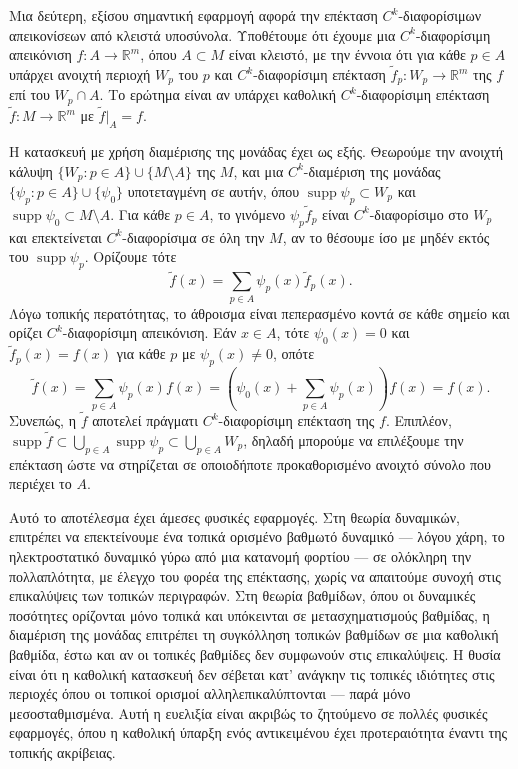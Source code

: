 \documentclass[11pt,a4paper,twoside,openright]{book}
\begin{document}
Μια δεύτερη, εξίσου σημαντική εφαρμογή αφορά την επέκταση $C^k$-διαφορίσιμων απεικονίσεων από κλειστά υποσύνολα. Υποθέτουμε ότι έχουμε μια $C^k$-διαφορίσιμη απεικόνιση $f: A \to \mathbb{R}^m$, όπου $A \subset M$ είναι κλειστό, με την έννοια ότι για κάθε $p \in A$ υπάρχει ανοιχτή περιοχή $W_p$ του $p$ και $C^k$-διαφορίσιμη επέκταση $\widetilde{f}_p: W_p \to \mathbb{R}^m$ της $f$ επί του $W_p \cap A$. Το ερώτημα είναι αν υπάρχει καθολική $C^k$-διαφορίσιμη επέκταση $\widetilde{f}: M \to \mathbb{R}^m$ με $\widetilde{f}|_A = f$.

Η κατασκευή με χρήση διαμέρισης της μονάδας έχει ως εξής. Θεωρούμε την ανοιχτή κάλυψη $\{W_p : p \in A\} \cup \{M \setminus A\}$ της $M$, και μια $C^k$-διαμέριση της μονάδας $\{\psi_p : p \in A\} \cup \{\psi_0\}$ υποτεταγμένη σε αυτήν, όπου $\operatorname{supp} \psi_p \subset W_p$ και $\operatorname{supp} \psi_0 \subset M \setminus A$. Για κάθε $p \in A$, το γινόμενο $\psi_p \widetilde{f}_p$ είναι $C^k$-διαφορίσιμο στο $W_p$ και επεκτείνεται $C^k$-διαφορίσιμα σε όλη την $M$, αν το θέσουμε ίσο με μηδέν εκτός του $\operatorname{supp} \psi_p$. Ορίζουμε τότε
\begin{equation*}
\widetilde{f}(x) = \sum_{p \in A} \psi_p(x) \widetilde{f}_p(x).
\end{equation*}
Λόγω τοπικής περατότητας, το άθροισμα είναι πεπερασμένο κοντά σε κάθε σημείο και ορίζει $C^k$-διαφορίσιμη απεικόνιση. Εάν $x \in A$, τότε $\psi_0(x) = 0$ και $\widetilde{f}_p(x) = f(x)$ για κάθε $p$ με $\psi_p(x) \neq 0$, οπότε
\begin{equation*}
\widetilde{f}(x) = \sum_{p \in A} \psi_p(x) f(x) = \left( \psi_0(x) + \sum_{p \in A} \psi_p(x) \right) f(x) = f(x).
\end{equation*}
Συνεπώς, η $\widetilde{f}$ αποτελεί πράγματι $C^k$-διαφορίσιμη επέκταση της $f$. Επιπλέον, $\operatorname{supp} \widetilde{f} \subset \bigcup_{p \in A} \operatorname{supp} \psi_p \subset \bigcup_{p \in A} W_p$, δηλαδή μπορούμε να επιλέξουμε την επέκταση ώστε να στηρίζεται σε οποιοδήποτε προκαθορισμένο ανοιχτό σύνολο που περιέχει το $A$.

Αυτό το αποτέλεσμα έχει άμεσες φυσικές εφαρμογές. Στη θεωρία δυναμικών, επιτρέπει να επεκτείνουμε ένα τοπικά ορισμένο βαθμωτό δυναμικό --- λόγου χάρη, το ηλεκτροστατικό δυναμικό γύρω από μια κατανομή φορτίου --- σε ολόκληρη την πολλαπλότητα, με έλεγχο του φορέα της επέκτασης, χωρίς να απαιτούμε συνοχή στις επικαλύψεις των τοπικών περιγραφών. Στη θεωρία βαθμίδων, όπου οι δυναμικές ποσότητες ορίζονται μόνο τοπικά και υπόκεινται σε μετασχηματισμούς βαθμίδας, η διαμέριση της μονάδας επιτρέπει τη συγκόλληση τοπικών βαθμίδων σε μια καθολική βαθμίδα, έστω και αν οι τοπικές βαθμίδες δεν συμφωνούν στις επικαλύψεις. Η θυσία είναι ότι η καθολική κατασκευή δεν σέβεται κατ' ανάγκην τις τοπικές ιδιότητες στις περιοχές όπου οι τοπικοί ορισμοί αλληλεπικαλύπτονται --- παρά μόνο μεσοσταθμισμένα. Αυτή η ευελιξία είναι ακριβώς το ζητούμενο σε πολλές φυσικές εφαρμογές, όπου η καθολική ύπαρξη ενός αντικειμένου έχει προτεραιότητα έναντι της τοπικής ακρίβειας.
\end{document}
